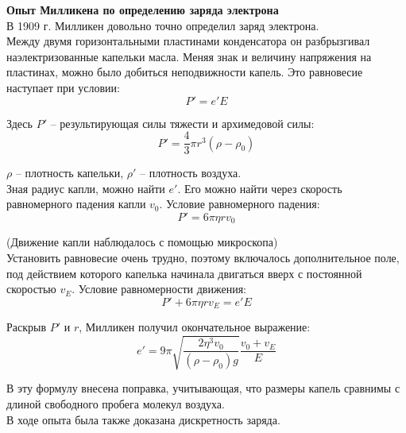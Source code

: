 \documentclass{article}
\begin{document}
	
	\textbf{Опыт Милликена по определению заряда электрона}\\

	В 1909 г. Милликен довольно точно определил заряд электрона.\\

	Между двумя горизонтальными пластинами конденсатора он разбрызгивал наэлектризованные капельки масла. Меняя знак и величину напряжения на пластинах, можно было добиться неподвижности капель. Это равновесие наступает при условии:
	\begin{equation}
		P' = e'E
	\end{equation}

	Здесь $P'$ -- результирующая силы тяжести и архимедовой силы:
	\begin{equation}
		P' = \frac{4}{3}\pi r^3 (\rho - \rho_0)
	\end{equation}

	$\rho$ -- плотность капельки, $\rho'$ -- плотность воздуха.\\

	Зная радиус капли, можно найти $e'$. Его можно найти через скорость равномерного падения капли $v_0$. Условие равномерного падения:
	\begin{equation}
		P' = 6\pi\eta r v_0
	\end{equation}

	(Движение капли наблюдалось с помощью микроскопа)\\

	Установить равновесие очень трудно, поэтому включалось дополнительное поле, под действием которого капелька начинала двигаться вверх с постоянной скоростью $v_E$. Условие равномерности движения:
	\begin{equation}
		P' + 6\pi\eta r v_E = e'E
	\end{equation}

	Раскрыв $P'$ и $r$, Милликен получил окончательное выражение:
	\begin{equation}
		e' = 9\pi\sqrt{\frac{2\eta^3 v_0}{(\rho-\rho_0)g}}\frac{v_0+v_E}{E}
	\end{equation}

	В эту формулу внесена поправка, учитывающая, что размеры капель сравнимы с длиной свободного пробега молекул воздуха.\\

	В ходе опыта была также доказана дискретность заряда.
\end{document}
